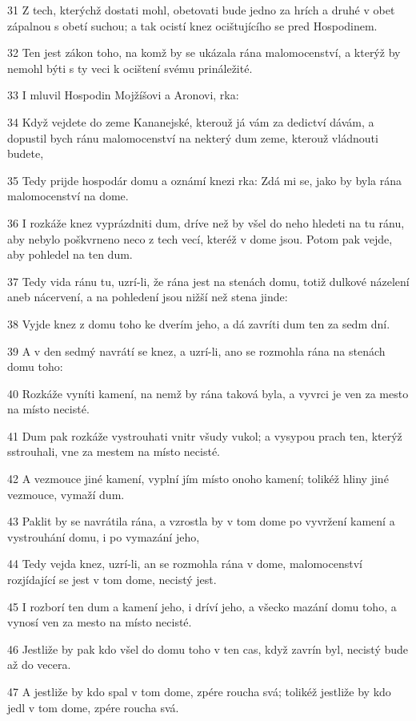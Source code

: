 \par 31 Z tech, kterýchž dostati mohl, obetovati bude jedno za hrích a druhé v obet zápalnou s obetí suchou; a tak ocistí knez ocištujícího se pred Hospodinem.
\par 32 Ten jest zákon toho, na komž by se ukázala rána malomocenství, a kterýž by nemohl býti s ty veci k ocištení svému prináležité.
\par 33 I mluvil Hospodin Mojžíšovi a Aronovi, rka:
\par 34 Když vejdete do zeme Kananejské, kterouž já vám za dedictví dávám, a dopustil bych ránu malomocenství na nekterý dum zeme, kterouž vládnouti budete,
\par 35 Tedy prijde hospodár domu a oznámí knezi rka: Zdá mi se, jako by byla rána malomocenství na dome.
\par 36 I rozkáže knez vyprázdniti dum, dríve než by všel do neho hledeti na tu ránu, aby nebylo poškvrneno neco z tech vecí, kteréž v dome jsou. Potom pak vejde, aby pohledel na ten dum.
\par 37 Tedy vida ránu tu, uzrí-li, že rána jest na stenách domu, totiž dulkové názelení aneb nácervení, a na pohledení jsou nižší než stena jinde:
\par 38 Vyjde knez z domu toho ke dverím jeho, a dá zavríti dum ten za sedm dní.
\par 39 A v den sedmý navrátí se knez, a uzrí-li, ano se rozmohla rána na stenách domu toho:
\par 40 Rozkáže vyníti kamení, na nemž by rána taková byla, a vyvrci je ven za mesto na místo necisté.
\par 41 Dum pak rozkáže vystrouhati vnitr všudy vukol; a vysypou prach ten, kterýž sstrouhali, vne za mestem na místo necisté.
\par 42 A vezmouce jiné kamení, vyplní jím místo onoho kamení; tolikéž hliny jiné vezmouce, vymaží dum.
\par 43 Paklit by se navrátila rána, a vzrostla by v tom dome po vyvržení kamení a vystrouhání domu, i po vymazání jeho,
\par 44 Tedy vejda knez, uzrí-li, an se rozmohla rána v dome, malomocenství rozjídající se jest v tom dome, necistý jest.
\par 45 I rozborí ten dum a kamení jeho, i dríví jeho, a všecko mazání domu toho, a vynosí ven za mesto na místo necisté.
\par 46 Jestliže by pak kdo všel do domu toho v ten cas, když zavrín byl, necistý bude až do vecera.
\par 47 A jestliže by kdo spal v tom dome, zpére roucha svá; tolikéž jestliže by kdo jedl v tom dome, zpére roucha svá.
